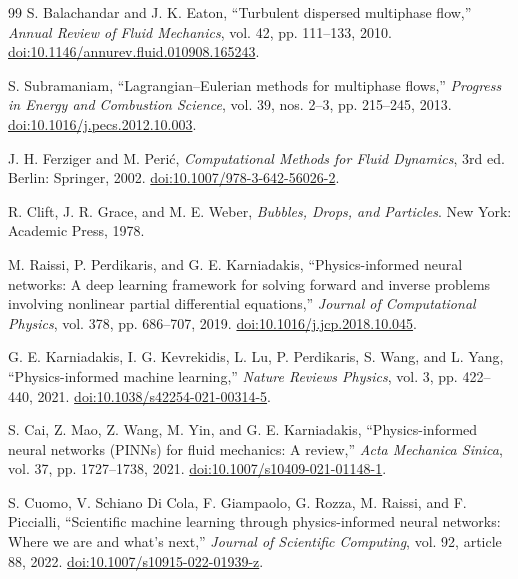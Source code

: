 \clearpage
\renewcommand{\bibname}{References}
\begin{thebibliography}{99}
S. Balachandar and J. K. Eaton, ``Turbulent dispersed multiphase flow,''
\emph{Annual Review of Fluid Mechanics}, vol. 42, pp. 111--133, 2010.
\href{https://doi.org/10.1146/annurev.fluid.010908.165243}{doi:10.1146/annurev.fluid.010908.165243}.

S. Subramaniam, ``Lagrangian--Eulerian methods for multiphase flows,''
\emph{Progress in Energy and Combustion Science}, vol. 39, nos. 2--3,
pp. 215--245, 2013.
\href{https://doi.org/10.1016/j.pecs.2012.10.003}{doi:10.1016/j.pecs.2012.10.003}.

J. H. Ferziger and M. Peri\'c, \emph{Computational Methods for Fluid
Dynamics}, 3rd ed. Berlin: Springer, 2002.
\href{https://doi.org/10.1007/978-3-642-56026-2}{doi:10.1007/978-3-642-56026-2}.

R. Clift, J. R. Grace, and M. E. Weber, \emph{Bubbles, Drops, and
Particles}. New York: Academic Press, 1978.

M. Raissi, P. Perdikaris, and G. E. Karniadakis,
``Physics-informed neural networks: A deep learning framework for solving
forward and inverse problems involving nonlinear partial differential
equations,'' \emph{Journal of Computational Physics}, vol. 378,
pp. 686--707, 2019.
\href{https://doi.org/10.1016/j.jcp.2018.10.045}{doi:10.1016/j.jcp.2018.10.045}.

G. E. Karniadakis, I. G. Kevrekidis, L. Lu, P. Perdikaris, S. Wang, and
L. Yang, ``Physics-informed machine learning,'' \emph{Nature Reviews
Physics}, vol. 3, pp. 422--440, 2021.
\href{https://doi.org/10.1038/s42254-021-00314-5}{doi:10.1038/s42254-021-00314-5}.

S. Cai, Z. Mao, Z. Wang, M. Yin, and G. E. Karniadakis,
``Physics-informed neural networks (PINNs) for fluid mechanics: A
review,'' \emph{Acta Mechanica Sinica}, vol. 37, pp. 1727--1738, 2021.
\href{https://doi.org/10.1007/s10409-021-01148-1}{doi:10.1007/s10409-021-01148-1}.

S. Cuomo, V. Schiano Di Cola, F. Giampaolo, G. Rozza, M. Raissi, and
F. Piccialli, ``Scientific machine learning through physics-informed
neural networks: Where we are and what's next,'' \emph{Journal of
Scientific Computing}, vol. 92, article 88, 2022.
\href{https://doi.org/10.1007/s10915-022-01939-z}{doi:10.1007/s10915-022-01939-z}.


\end{thebibliography}
